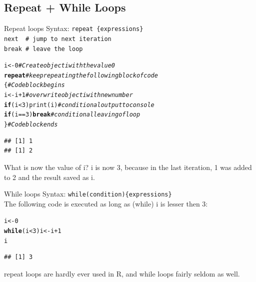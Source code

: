 \documentclass[xcolor=table,           xcolor=dvipsnames]{beamer}\usepackage[]{graphicx}\usepackage[]{color}
\makeatletter
\newcommand{\hlnum}[1]{\textcolor[rgb]{0,0,0}{#1}}
\newcommand{\hlcom}[1]{\textcolor[rgb]{0,0.392,0}{\textit{#1}}}
\newcommand{\hlopt}[1]{\textcolor[rgb]{0,0,0}{#1}}
\newcommand{\hlstd}[1]{\textcolor[rgb]{0,0,0}{#1}}
\newcommand{\hlkwa}[1]{\textcolor[rgb]{1,0,0}{\textbf{#1}}}
\newcommand{\hlkwb}[1]{\textcolor[rgb]{0,0,0}{#1}}
\newcommand{\hlkwd}[1]{\textcolor[rgb]{0,0,1}{#1}}
\newenvironment{kframe}{%
 \def\at@end@of@kframe{}%
 \ifinner\ifhmode%
  \def\at@end@of@kframe{\end{minipage}}%
  \begin{minipage}{\columnwidth}%
 \fi\fi%
 \def\FrameCommand##1{\hskip\@totalleftmargin \hskip-\fboxsep
 \colorbox{shadecolor}{##1}\hskip-\fboxsep
     \hskip-\linewidth \hskip-\@totalleftmargin \hskip\columnwidth}%
 \MakeFramed {\advance\hsize-\width
   \@totalleftmargin\z@ \linewidth\hsize
   \@setminipage}}%
 {\par\unskip\endMakeFramed%
 \at@end@of@kframe}
\newenvironment{knitrout}{}{} %
\makeatother
\begin{document}
\subsection{Repeat + While Loops}

\begin{frame}[fragile]{Repeat loops}
Syntax:
\texttt{\alert{repeat} \{expressions\}\\
\alert{next} ~\# jump to next iteration\\
\alert{break} \# leave the loop}
\pause
\begin{knitrout}\small
{}\color{fgcolor}\begin{kframe}
\begin{alltt}
\hlstd{i} \hlkwb{<-} \hlnum{0} \hlcom{# Create object i with the value 0}
\hlkwa{repeat} \hlcom{# keep repeating the following block of code}
   \hlstd{\{}                    \hlcom{# Codeblock begins}
   \hlstd{i} \hlkwb{<-} \hlstd{i} \hlopt{+} \hlnum{1}           \hlcom{# overwrite object i with new number}
   \hlkwa{if} \hlstd{(i} \hlopt{<} \hlnum{3}\hlstd{)}  \hlkwd{print}\hlstd{(i)} \hlcom{# conditional output to console}
   \hlkwa{if} \hlstd{(i} \hlopt{==} \hlnum{3}\hlstd{)}   \hlkwa{break}  \hlcom{# conditional leaving of loop}
   \hlstd{\}}                    \hlcom{# Codeblock ends}
\end{alltt}
\begin{verbatim}
## [1] 1
## [1] 2
\end{verbatim}
\end{kframe}
\end{knitrout}
What is now the value of i?
\pause
\small i is now 3, because in the last iteration, 1 was added to 2 and the result saved as i.
\end{frame}


\begin{frame}[fragile]{While loops}
Syntax: \texttt{\alert{while}(condition)\{expressions\}}\\[\baselineskip]
The following code is executed as long as  (while) i is lesser then 3:
\begin{knitrout}
\color{fgcolor}\begin{kframe}
\begin{alltt}
\hlstd{i} \hlkwb{<-} \hlnum{0}
\hlkwa{while}\hlstd{(i} \hlopt{<} \hlnum{3}\hlstd{) i} \hlkwb{<-} \hlstd{i} \hlopt{+} \hlnum{1}
\hlstd{i}
\end{alltt}
\begin{verbatim}
## [1] 3
\end{verbatim}
\end{kframe}
\end{knitrout}
repeat loops are hardly ever used in R, and while loops fairly seldom as well.
\end{frame}
\end{document}
